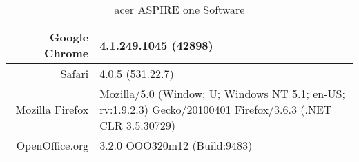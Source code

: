   \begin{table}
    \begin{center}
    \begin{tabular}{| r | p{5cm} |}
      \hline
      Google Chrome                & 4.1.249.1045 (42898) \\ \hline
      Safari                       & 4.0.5 (531.22.7) \\ \hline
      Mozilla Firefox              & Mozilla/5.0 (Window; U; Windows NT 5.1;
      en-US; rv:1.9.2.3) Gecko/20100401
      Firefox/3.6.3 (.NET CLR 3.5.30729) \\ \hline
      OpenOffice.org               & 3.2.0 OOO320m12 (Build:9483) \\
      \hline
    \end{tabular}
    \caption{acer ASPIRE one Software}
    \label{aspireSoftware}
    \end{center}
  \end{table}
